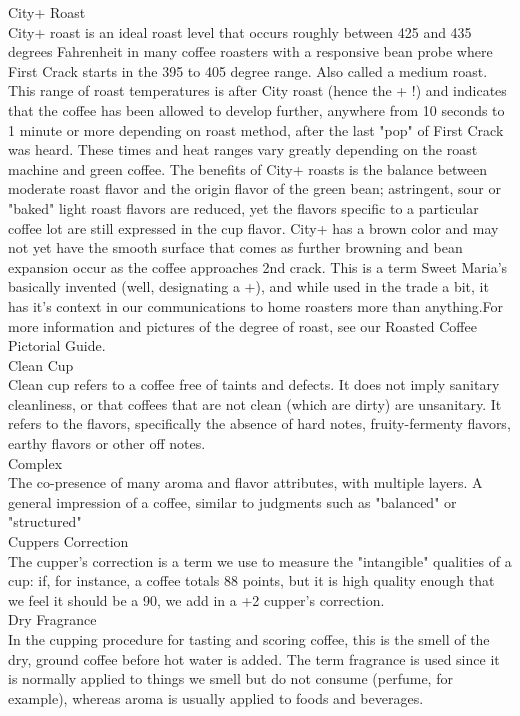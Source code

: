 \documentclass[10pt,twoside,footinclude=true,headinclude=true]{scrbook} %
\begin{document}
\begin{multicols}{2}
\medskip
{\smallcaps \small City+ Roast}\\
City+ roast is an ideal roast level that occurs roughly between 425 and 435 degrees Fahrenheit in many coffee roasters with a responsive bean probe where First Crack starts in the 395 to 405 degree range. Also called a medium roast. This range of roast temperatures is after City roast (hence the + !) and indicates that the coffee has been allowed to develop further, anywhere from 10 seconds to 1 minute or more depending on roast method, after the last "pop" of First Crack was heard. These times and heat ranges vary greatly depending on the roast machine and green coffee. The benefits of City+ roasts is the balance between moderate roast flavor and the origin flavor of the green bean; astringent, sour or "baked" light roast flavors are reduced, yet the flavors specific to a particular coffee lot are still expressed in the cup flavor. City+ has a brown color and may not yet have the smooth surface that comes as further browning and bean expansion occur as the coffee approaches 2nd crack. This is a term Sweet Maria's basically invented (well, designating a +), and while used in the trade a bit, it has it's context in our communications to home roasters more than anything.For more information and pictures of the degree of roast, see our  Roasted Coffee Pictorial Guide.\\
\medskip
{\smallcaps \small Clean Cup}\\
Clean cup refers to a coffee free of taints and defects. It does not imply sanitary cleanliness, or that coffees that are not clean (which are dirty) are unsanitary. It refers to the flavors, specifically the absence of hard notes, fruity-fermenty flavors, earthy flavors or other off notes.\\
\medskip
{\smallcaps \small Complex}\\
The co-presence of many aroma and flavor attributes, with multiple layers. A general impression of a coffee, similar to judgments such as "balanced" or "structured"\\
\medskip
{\smallcaps \small Cuppers Correction}\\
The cupper's correction is a term we use to measure the "intangible" qualities of a cup: if, for instance, a coffee totals 88 points, but it is high quality enough that we feel it should be a 90, we add in a +2 cupper's correction.\\
\medskip
{\smallcaps \small Dry Fragrance}\\
In the cupping procedure for tasting and scoring coffee, this is the smell of the dry, ground coffee before hot water is added. The term fragrance is used since it is normally applied to things we smell but do not consume (perfume, for example), whereas aroma is usually applied to foods and beverages.\\

\end{multicols}
\end{document}
